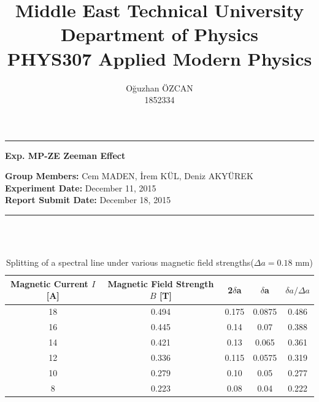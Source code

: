 \documentclass[a4paper,12pt]{article}
\title{Middle East Technical University\\Department of Physics\\\textbf{PHYS307 Applied Modern Physics}}
\author{Oğuzhan ÖZCAN\\1852334}
\date{}
\providecommand{\groupmember}[1]{\textbf{Group Members:} }
\providecommand{\expdate}[1]{\textbf{Experiment Date:} }
\providecommand{\repdate}[1]{\textbf{Report Submit Date:} }
\providecommand{\expname}[1]{\textbf{Exp. MP-ZE Zeeman Effect} }
\begin{document}
\maketitle

\thispagestyle{fancy}

\noindent\rule{18.4cm}{0.8pt}
\begin{center}
	\expname{arg1}{}
\end{center}
\groupmember{arg1}{Cem MADEN, İrem KÜL, Deniz AKYÜREK}\\
\expdate{November 6, 2015}{December 11, 2015}\\
\repdate{arg1}{December 18, 2015}\\
\noindent\rule{18.4cm}{0.8pt}\\\\
\begin{table}[h!]
\begin{center}
	\begin{tabular}{|c|c|c|c|c|}
	\hline \textbf{Magnetic Current $I$ [A]}  &\textbf{ Magnetic Field Strength $B$ [T]} & 2$\delta$a & $\delta$a & $\delta a / \Delta a$ \\ 
	\hline 18 & 0.494 & 0.175 & 0.0875 & 0.486 \\ 
	\hline 16 & 0.445 & 0.14 & 0.07 & 0.388 \\ 
	\hline 14 & 0.421 & 0.13 & 0.065 & 0.361 \\ 
	\hline 12 & 0.336 & 0.115 & 0.0575 & 0.319 \\ 
	\hline 10 & 0.279 & 0.10 & 0.05 & 0.277 \\ 
	\hline 8 & 0.223 & 0.08 & 0.04 & 0.222 \\ 
	\hline 
\end{tabular} 
\end{center}
\caption{Splitting of a spectral line under various magnetic field strengths($\Delta a=0.18$ mm)}
\end{table}
\end{document}
